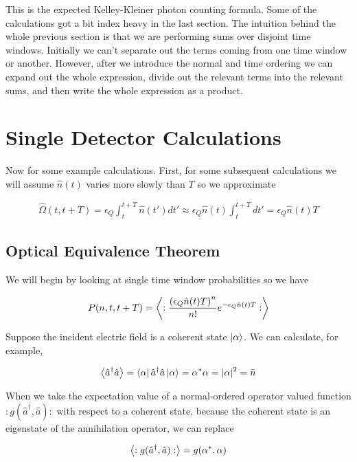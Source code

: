 \documentclass[12pt]{article}
\begin{document}
This is the expected Kelley-Kleiner photon counting formula. Some of the calculations got a bit index heavy in the last section. The intuition behind the whole previous section is that we are performing sums over disjoint time windows. Initially we can't separate out the terms coming from one time window or another. However, after we introduce the normal and time ordering we can expand out the whole expression, divide out the relevant terms into the relevant sums, and then write the whole expression as a product.

\section{Single Detector Calculations}
Now for some example calculations. First, for some subsequent calculations we will assume $\hat{n}(t)$ varies more slowly than $T$ so we approximate

\begin{align}
\hat{\Omega}(t,t+T) = \epsilon_Q\int_t^{t+T} \hat{n}(t') dt' \approx \epsilon_Q \hat{n}(t) \int_t^{t+T} dt' =  \epsilon_Q \hat{n}(t)T
\end{align} 

\subsection{Optical Equivalence Theorem}

We will begin by looking at single time window probabilities so we have

\begin{align}
P(n,t,t+T) = \Braket{:\frac{\left(\epsilon_Q \hat{n}(t)T \right)^n}{n!}e^{-\epsilon_Q \hat{n}(t) T}:}
\end{align}

Suppose the incident electric field is a coherent state $\ket{\alpha}$. We can calculate, for example,

\begin{align}
\Braket{\hat{a}^{\dag} \hat{a}} = \bra{\alpha}\hat{a}^{\dag} \hat{a} \ket{\alpha} = \alpha^* \alpha = |\alpha|^2 = \bar{n}
\end{align}

When we take the expectation value of a normal-ordered operator valued function $:g(\hat{a}^{\dag},\hat{a}):$ with respect to a coherent state, because the coherent state is an eigenstate of the annihilation operator, we can replace

\begin{align}
\Braket{:g(\hat{a}^{\dag},\hat{a}):} = g(\alpha^*,\alpha)
\end{align}
\end{document}
